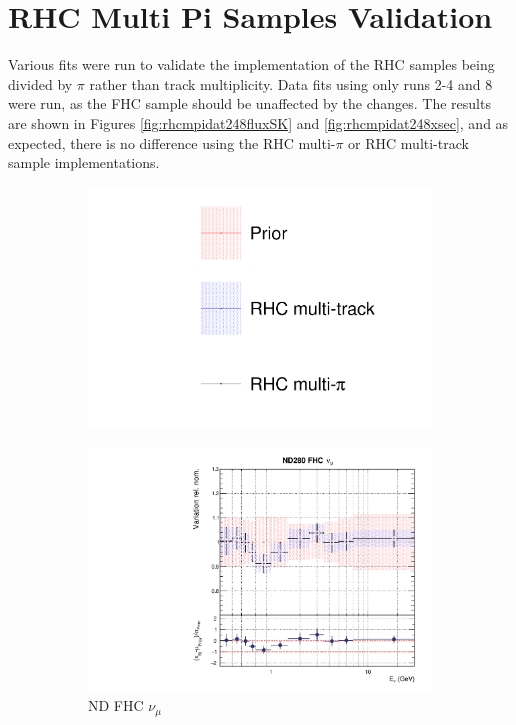 \chapter{RHC Multi Pi Samples Validation}\label{appendix:rhcmpi}

Various fits were run to validate the implementation of the RHC samples being divided by $\pi$ rather than track multiplicity. Data fits using only runs 2-4 and 8 were run, as the FHC sample should be unaffected by the changes. The results are shown in Figures \ref{fig:rhcmpidat248fluxSK} and \ref{fig:rhcmpidat248xsec}, and as expected, there is no difference using the RHC multi-$\pi$ or RHC multi-track sample implementations. 

\begin{figure}[t]
\centering
\begin{subfigure}{0.95\textwidth}
  \centering
  \includegraphics[width=0.24\linewidth]{figs/rhcmpdat248_leg}
  \caption{}
  \label{fig:}
\end{subfigure}
\begin{subfigure}{0.24\textwidth}
  \centering
  \includegraphics[width=0.95\linewidth]{figs/rhcmpdat248flux_0}
  \caption{ND FHC $\nu_{\mu}$}
  \label{fig:}
\end{subfigure}
\begin{subfigure}{0.24\textwidth}
  \centering

\end{subfigure}
\end{figure}
